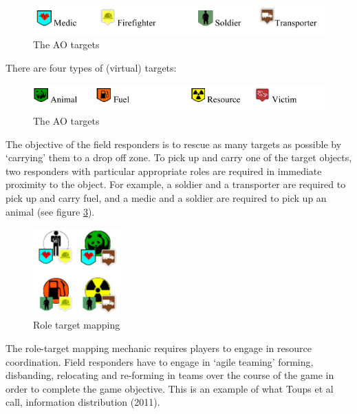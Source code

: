 \begin{figure}[h]
  \centering
  \includegraphics[width=1\textwidth]{img/approach/AOroles}
  \caption{The AO targets}
  \label{fig:AOroles}
\end{figure}

There are four types of (virtual) targets:\\

\begin{figure}[h]
  \centering
  \includegraphics[width=1\textwidth]{img/approach/AOtargets}
  \caption{The AO targets}
  \label{fig:AOtargets}
\end{figure}

The objective of the field responders is to rescue as many targets as possible by `carrying' them to a drop off zone. To pick up and carry one of the target objects, two responders with particular appropriate roles are required in immediate proximity to the object. For example, a soldier and a transporter are required to pick up and carry fuel, and a medic and a soldier are required to pick up an animal (see figure \ref{fig:roleTargetMapping}).\\

\begin{figure}[h]
  \centering
  \includegraphics[width=0.3\textwidth]{img/approach/roleTargetMapping}
  \caption{Role target mapping}
  \label{fig:roleTargetMapping}
\end{figure}

The role-target mapping mechanic requires players to engage in resource coordination. Field responders have to engage in `agile teaming' forming, disbanding, relocating and re-forming in teams over the course of the game in order to complete the game objective. This is an example of what Toups et al call, information distribution (2011).\\

